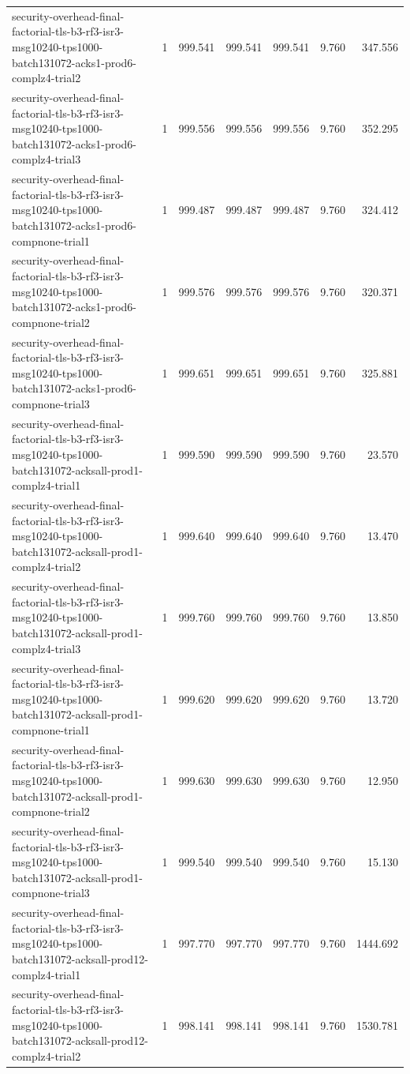 \begin{tabular}{lrrrrrr}
security-overhead-final-factorial-tls-b3-rf3-isr3-msg10240-tps1000-batch131072-acks1-prod6-complz4-trial2 & 1 & 999.541 & 999.541 & 999.541 & 9.760 & 347.556 \\
security-overhead-final-factorial-tls-b3-rf3-isr3-msg10240-tps1000-batch131072-acks1-prod6-complz4-trial3 & 1 & 999.556 & 999.556 & 999.556 & 9.760 & 352.295 \\
security-overhead-final-factorial-tls-b3-rf3-isr3-msg10240-tps1000-batch131072-acks1-prod6-compnone-trial1 & 1 & 999.487 & 999.487 & 999.487 & 9.760 & 324.412 \\
security-overhead-final-factorial-tls-b3-rf3-isr3-msg10240-tps1000-batch131072-acks1-prod6-compnone-trial2 & 1 & 999.576 & 999.576 & 999.576 & 9.760 & 320.371 \\
security-overhead-final-factorial-tls-b3-rf3-isr3-msg10240-tps1000-batch131072-acks1-prod6-compnone-trial3 & 1 & 999.651 & 999.651 & 999.651 & 9.760 & 325.881 \\
security-overhead-final-factorial-tls-b3-rf3-isr3-msg10240-tps1000-batch131072-acksall-prod1-complz4-trial1 & 1 & 999.590 & 999.590 & 999.590 & 9.760 & 23.570 \\
security-overhead-final-factorial-tls-b3-rf3-isr3-msg10240-tps1000-batch131072-acksall-prod1-complz4-trial2 & 1 & 999.640 & 999.640 & 999.640 & 9.760 & 13.470 \\
security-overhead-final-factorial-tls-b3-rf3-isr3-msg10240-tps1000-batch131072-acksall-prod1-complz4-trial3 & 1 & 999.760 & 999.760 & 999.760 & 9.760 & 13.850 \\
security-overhead-final-factorial-tls-b3-rf3-isr3-msg10240-tps1000-batch131072-acksall-prod1-compnone-trial1 & 1 & 999.620 & 999.620 & 999.620 & 9.760 & 13.720 \\
security-overhead-final-factorial-tls-b3-rf3-isr3-msg10240-tps1000-batch131072-acksall-prod1-compnone-trial2 & 1 & 999.630 & 999.630 & 999.630 & 9.760 & 12.950 \\
security-overhead-final-factorial-tls-b3-rf3-isr3-msg10240-tps1000-batch131072-acksall-prod1-compnone-trial3 & 1 & 999.540 & 999.540 & 999.540 & 9.760 & 15.130 \\
security-overhead-final-factorial-tls-b3-rf3-isr3-msg10240-tps1000-batch131072-acksall-prod12-complz4-trial1 & 1 & 997.770 & 997.770 & 997.770 & 9.760 & 1444.692 \\
security-overhead-final-factorial-tls-b3-rf3-isr3-msg10240-tps1000-batch131072-acksall-prod12-complz4-trial2 & 1 & 998.141 & 998.141 & 998.141 & 9.760 & 1530.781 \\

\end{tabular}
